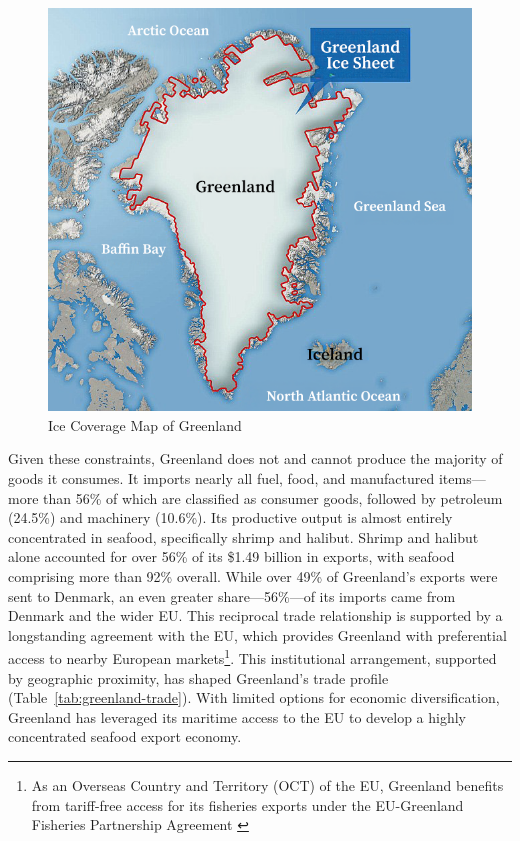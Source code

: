\documentclass{adonis}
\begin{document}
    \begin{figure}[H]
        \centering
        \includegraphics[width=0.5\linewidth]{images/greenland-ice-sheet.png}
        \caption{Ice Coverage Map of Greenland \citep{plummer2016greenland}}
        \label{fig:greenland-ice-map}
    \end{figure}
   Given these constraints, Greenland does not and cannot produce the majority of goods it consumes. It imports nearly all fuel, food, and manufactured items—more than 56\% of which are classified as consumer goods, followed by petroleum (24.5\%) and machinery (10.6\%). Its productive output is almost entirely concentrated in seafood, specifically shrimp and halibut. Shrimp and halibut alone accounted for over 56\% of its \$1.49 billion in exports, with seafood comprising more than 92\% overall. While over 49\% of Greenland’s exports were sent to Denmark, an even greater share—56\%—of its imports came from Denmark and the wider EU. This reciprocal trade relationship is supported by a longstanding agreement with the EU, which provides Greenland with preferential access to nearby European markets\footnote{As an Overseas Country and Territory (OCT) of the EU, Greenland benefits from tariff-free access for its fisheries exports under the EU-Greenland Fisheries Partnership Agreement \citep{oec2025}}. This institutional arrangement, supported by geographic proximity, has shaped Greenland’s trade profile  (Table~\ref{tab:greenland-trade}). With limited options for economic diversification, Greenland has leveraged its maritime access to the EU to develop a highly concentrated seafood export economy. 
\end{document}
